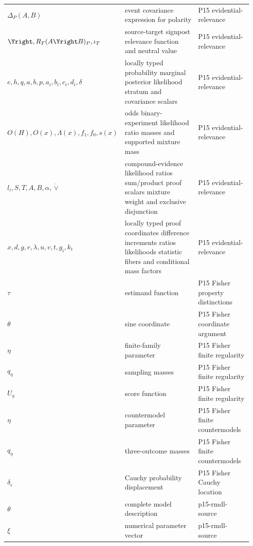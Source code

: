 \begin{longtable}{@{}p{}p{}p{}@{}}
\(\Delta_P(A,\allowbreak B)\) & event covariance expression for polarity & P15 evidential-\allowbreak{}relevance \\
\(\Yright,\allowbreak R_T(A\Yright B)_P,\allowbreak \iota_T\) & source-target signpost relevance function and neutral value & P15 evidential-\allowbreak{}relevance \\
\(e,\allowbreak h,\allowbreak q,\allowbreak a,\allowbreak b,\allowbreak p,\allowbreak a_i,\allowbreak b_i,\allowbreak c_i,\allowbreak d_i,\allowbreak \delta\) & locally typed probability marginal posterior likelihood stratum and covariance scalars & P15 evidential-\allowbreak{}relevance \\
\(O(H),\allowbreak O(x),\allowbreak \Lambda(x),\allowbreak f_1,\allowbreak f_0,\allowbreak s(x)\) & odds binary-experiment likelihood ratio masses and supported mixture mass & P15 evidential-\allowbreak{}relevance \\
\(l_i,\allowbreak S,\allowbreak T,\allowbreak A,\allowbreak B,\allowbreak \alpha,\allowbreak \dot\vee\) & compound-evidence likelihood ratios sum/product proof scalars mixture weight and exclusive disjunction & P15 evidential-\allowbreak{}relevance \\
\(x,\allowbreak d,\allowbreak g,\allowbreak r,\allowbreak \lambda,\allowbreak u,\allowbreak v,\allowbreak t,\allowbreak g_i,\allowbreak k_t\) & locally typed proof coordinates difference increments ratios likelihoods statistic fibers and conditional mass factors & P15 evidential-\allowbreak{}relevance \\
\(\tau\) & estimand function & P15 Fisher property distinctions \\
\(\theta\) & sine coordinate & P15 Fisher coordinate argument \\
\(\eta\) & finite-family parameter & P15 Fisher finite regularity \\
\(q_\eta\) & sampling masses & P15 Fisher finite regularity \\
\(U_\eta\) & score function & P15 Fisher finite regularity \\
\(\eta\) & countermodel parameter & P15 Fisher finite countermodels \\
\(q_\eta\) & three-outcome masses & P15 Fisher finite countermodels \\
\(\delta_\epsilon\) & Cauchy probability displacement & P15 Fisher Cauchy location \\
\(\theta\) & complete model description & p15-\allowbreak{}rmdl-\allowbreak{}source \\
\(\xi\) & numerical parameter vector & p15-\allowbreak{}rmdl-\allowbreak{}source \\

\end{longtable}
